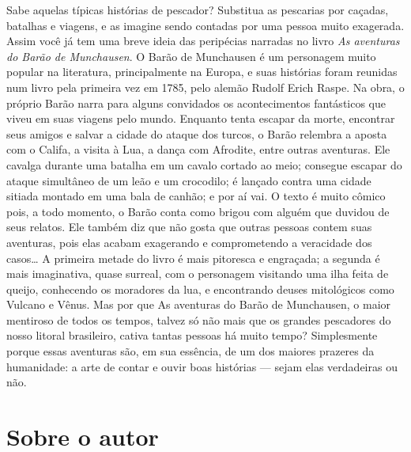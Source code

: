 \documentclass[11pt]{extarticle}
\begin{document}
Sabe aquelas típicas histórias de pescador? Substitua as pescarias por caçadas, batalhas e viagens, e as imagine sendo contadas por uma pessoa muito exagerada. Assim você já tem uma breve ideia das peripécias narradas no livro \textit{As aventuras do Barão de Munchausen}. O Barão de Munchausen é um personagem muito popular na literatura, principalmente na Europa, e suas histórias foram reunidas num livro pela primeira vez em 1785, pelo alemão Rudolf Erich Raspe. Na obra, o próprio Barão narra para alguns convidados os acontecimentos fantásticos que viveu em suas viagens pelo mundo. Enquanto tenta escapar da morte, encontrar seus amigos e salvar a cidade do ataque dos turcos, o Barão relembra a aposta com o Califa, a visita à Lua, a dança com Afrodite, entre outras aventuras. Ele cavalga durante uma batalha em um cavalo cortado ao meio; consegue escapar do ataque simultâneo de um leão e um crocodilo; é lançado contra uma cidade sitiada montado em uma bala de canhão; e por aí vai. O texto é muito cômico pois, a todo momento, o Barão conta como brigou com alguém que duvidou de seus relatos. Ele também diz que não gosta que outras pessoas contem suas aventuras, pois elas acabam exagerando e comprometendo a veracidade dos casos… A primeira metade do livro é mais pitoresca e engraçada; a segunda é mais imaginativa, quase surreal, com o personagem visitando uma ilha feita de queijo, conhecendo os moradores da lua, e encontrando deuses mitológicos como Vulcano e Vênus. Mas por que As aventuras do Barão de Munchausen, o maior mentiroso de todos os tempos, talvez só não mais que os grandes pescadores do nosso litoral brasileiro, cativa tantas pessoas há muito tempo? Simplesmente porque essas aventuras são, em sua essência, de um dos maiores prazeres da humanidade: a arte de contar e ouvir boas histórias — sejam elas verdadeiras ou não. 


\section{Sobre o autor}
\end{document}
